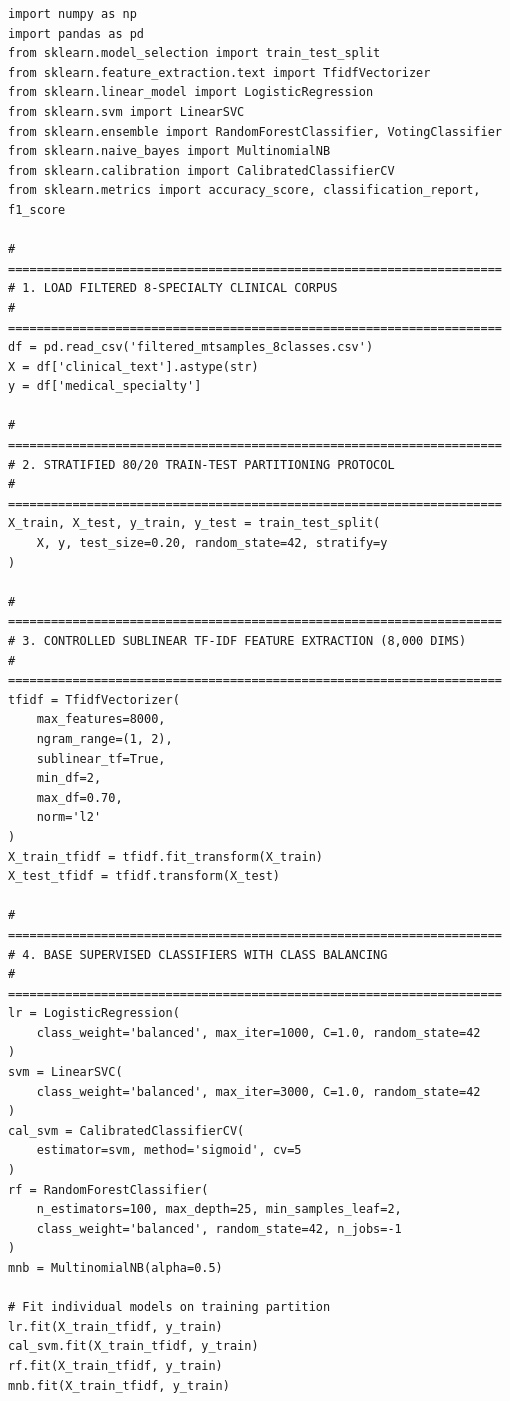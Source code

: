 \vspace{4pt}
\begin{footnotesize}
\begin{verbatim}
import numpy as np
import pandas as pd
from sklearn.model_selection import train_test_split
from sklearn.feature_extraction.text import TfidfVectorizer
from sklearn.linear_model import LogisticRegression
from sklearn.svm import LinearSVC
from sklearn.ensemble import RandomForestClassifier, VotingClassifier
from sklearn.naive_bayes import MultinomialNB
from sklearn.calibration import CalibratedClassifierCV
from sklearn.metrics import accuracy_score, classification_report, f1_score

# =====================================================================
# 1. LOAD FILTERED 8-SPECIALTY CLINICAL CORPUS
# =====================================================================
df = pd.read_csv('filtered_mtsamples_8classes.csv')
X = df['clinical_text'].astype(str)
y = df['medical_specialty']

# =====================================================================
# 2. STRATIFIED 80/20 TRAIN-TEST PARTITIONING PROTOCOL
# =====================================================================
X_train, X_test, y_train, y_test = train_test_split(
    X, y, test_size=0.20, random_state=42, stratify=y
)

# =====================================================================
# 3. CONTROLLED SUBLINEAR TF-IDF FEATURE EXTRACTION (8,000 DIMS)
# =====================================================================
tfidf = TfidfVectorizer(
    max_features=8000,
    ngram_range=(1, 2),
    sublinear_tf=True,
    min_df=2,
    max_df=0.70,
    norm='l2'
)
X_train_tfidf = tfidf.fit_transform(X_train)
X_test_tfidf = tfidf.transform(X_test)

# =====================================================================
# 4. BASE SUPERVISED CLASSIFIERS WITH CLASS BALANCING
# =====================================================================
lr = LogisticRegression(
    class_weight='balanced', max_iter=1000, C=1.0, random_state=42
)
svm = LinearSVC(
    class_weight='balanced', max_iter=3000, C=1.0, random_state=42
)
cal_svm = CalibratedClassifierCV(
    estimator=svm, method='sigmoid', cv=5
)
rf = RandomForestClassifier(
    n_estimators=100, max_depth=25, min_samples_leaf=2,
    class_weight='balanced', random_state=42, n_jobs=-1
)
mnb = MultinomialNB(alpha=0.5)

# Fit individual models on training partition
lr.fit(X_train_tfidf, y_train)
cal_svm.fit(X_train_tfidf, y_train)
rf.fit(X_train_tfidf, y_train)
mnb.fit(X_train_tfidf, y_train)


\end{verbatim}
\end{footnotesize}

